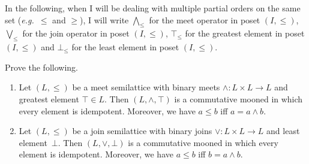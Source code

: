 \documentclass[fontsize=16pt,a4paper,DIV=17,parskip=half]{scrartcl}
\theoremstyle{definition}
\begin{document}
  \begin{note}
    In the following, when I will be dealing with multiple partial orders on the same set (\textit{e.g.}\ $\le$ and $\ge$), I will write $\bigwedge_\le$ for the meet operator in poset $(I, \le)$, $\bigvee_\le$ for the join operator in poset $(I, \le)$, $\top_{\le}$ for the greatest element in poset $(I, \le)$ and $\bot_{\le}$ for the least element in poset $(I, \le)$.
  \end{note}

  \begin{que}
    Prove the following.
    \begin{enumerate}
      \item Let $(L, \le)$ be a meet semilattice with binary meets $\wedge : L \times L \to L$ and greatest element $\top \in L$.
        Then $(L, \wedge, \top)$ is a commutative mooned in which every element is idempotent.
        Moreover, we have $a \le b$ iff $a = a \wedge b$.
      \item Let $(L, \le)$ be a join semilattice with binary joins $\vee : L \times L \to L$ and least element~$\bot$.
        Then $(L, \vee, \bot)$ is a commutative mooned in which every element is idempotent.
        Moreover, we have $a \le b$ iff $b = a \wedge b$.
    \end{enumerate}
  \end{que}
\end{document}
